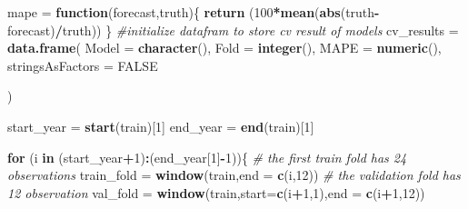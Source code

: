 \documentclass[
]{article}
\newenvironment{Shaded}{\begin{snugshade}}{\end{snugshade}}
\newcommand{\AttributeTok}[1]{\textcolor[rgb]{0.13,0.29,0.53}{#1}}
\newcommand{\CommentTok}[1]{\textcolor[rgb]{0.56,0.35,0.01}{\textit{#1}}}
\newcommand{\ConstantTok}[1]{\textcolor[rgb]{0.56,0.35,0.01}{#1}}
\newcommand{\ControlFlowTok}[1]{\textcolor[rgb]{0.13,0.29,0.53}{\textbf{#1}}}
\newcommand{\DecValTok}[1]{\textcolor[rgb]{0.00,0.00,0.81}{#1}}
\newcommand{\FunctionTok}[1]{\textcolor[rgb]{0.13,0.29,0.53}{\textbf{#1}}}
\newcommand{\NormalTok}[1]{#1}
\newcommand{\OtherTok}[1]{\textcolor[rgb]{0.56,0.35,0.01}{#1}}
\newcommand{\SpecialCharTok}[1]{\textcolor[rgb]{0.81,0.36,0.00}{\textbf{#1}}}
\begin{document}
\begin{Shaded}
\begin{Highlighting}[]
\NormalTok{mape }\OtherTok{=} \ControlFlowTok{function}\NormalTok{(forecast,truth)\{}
  \FunctionTok{return}\NormalTok{ (}\DecValTok{100}\SpecialCharTok{*}\FunctionTok{mean}\NormalTok{(}\FunctionTok{abs}\NormalTok{(truth}\SpecialCharTok{{-}}\NormalTok{forecast)}\SpecialCharTok{/}\NormalTok{truth))}
\NormalTok{\}}
\CommentTok{\#initialize datafram to store cv result of models }
\NormalTok{cv\_results }\OtherTok{=} \FunctionTok{data.frame}\NormalTok{(}
  \AttributeTok{Model =} \FunctionTok{character}\NormalTok{(),}
  \AttributeTok{Fold =} \FunctionTok{integer}\NormalTok{(),}
  \AttributeTok{MAPE =} \FunctionTok{numeric}\NormalTok{(),}
  \AttributeTok{stringsAsFactors =} \ConstantTok{FALSE}

\NormalTok{)}

\NormalTok{start\_year }\OtherTok{=} \FunctionTok{start}\NormalTok{(train)[}\DecValTok{1}\NormalTok{]}
\NormalTok{end\_year }\OtherTok{=} \FunctionTok{end}\NormalTok{(train)[}\DecValTok{1}\NormalTok{]}

\ControlFlowTok{for}\NormalTok{ (i }\ControlFlowTok{in}\NormalTok{ (start\_year}\SpecialCharTok{+}\DecValTok{1}\NormalTok{)}\SpecialCharTok{:}\NormalTok{(end\_year[}\DecValTok{1}\NormalTok{]}\SpecialCharTok{{-}}\DecValTok{1}\NormalTok{))\{}
  \CommentTok{\# the first train fold has 24 observations}
\NormalTok{  train\_fold }\OtherTok{=} \FunctionTok{window}\NormalTok{(train,}\AttributeTok{end =} \FunctionTok{c}\NormalTok{(i,}\DecValTok{12}\NormalTok{))}
  \CommentTok{\# the validation fold has 12 observation }
\NormalTok{  val\_fold }\OtherTok{=} \FunctionTok{window}\NormalTok{(train,}\AttributeTok{start=}\FunctionTok{c}\NormalTok{(i}\SpecialCharTok{+}\DecValTok{1}\NormalTok{,}\DecValTok{1}\NormalTok{),}\AttributeTok{end =} \FunctionTok{c}\NormalTok{(i}\SpecialCharTok{+}\DecValTok{1}\NormalTok{,}\DecValTok{12}\NormalTok{))}
  


\end{Highlighting}
\end{Shaded}
\end{document}
